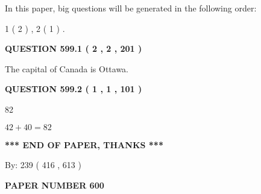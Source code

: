 \documentclass[12pt]{article}
\begin{document}
In this paper, big questions will be generated in the following order: 
   
   
   1 ( 2 )
 ,
   2 ( 1 )
 .
  
\vspace{0.2in}
  
{\textbf{\Large{QUESTION
599.1 
 ( 2 , 2 , 201 )
}}}
  
  
 
 
\noindent{}
 
 
The capital of Canada is Ottawa.
 
 
 
 
  
\vspace{0.2in}
  
{\textbf{\Large{QUESTION
599.2 
 ( 1 , 1 , 101 )
}}}
  
  
 
 
\noindent{}

82
 
 
 
 
\noindent{}

$ %
42 +  %
40=   %
82$
 
 
   
   
 \vspace{0.2in}
 
   
   
   
   
\vspace{1.0in} 
{\textbf{\large{ *** END OF PAPER, THANKS *** }}} 
   
   
\hspace{1.0in} By: 
 239 ( 416 ,  613 )
   
   
   
   
\newpage 
\setcounter{page}{ 
   600001 } 
   
   
   
   
 {\textbf{ \Large{ PAPER NUMBER  600  }}}
   
   
\vspace{0.2in}
   
   
   
   
   
\end{document}
